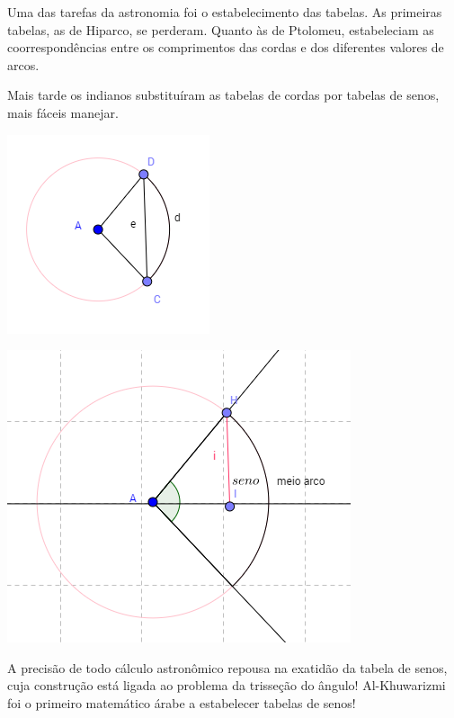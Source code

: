 Uma das tarefas da astronomia foi o estabelecimento das tabelas. As primeiras tabelas, as de Hiparco, se perderam. Quanto às de Ptolomeu, estabeleciam as coorrespondências entre os comprimentos das cordas e dos diferentes valores de arcos.

Mais tarde os indianos substituíram as tabelas de cordas por tabelas de senos, mais fáceis manejar.


\begin{center}
\includegraphics[scale=0.9]{./imagens/06.png}
\end{center}

\begin{center}
\includegraphics[scale=0.9]{./imagens/07.png}
\end{center}

A precisão de todo cálculo astronômico repousa na exatidão da tabela de senos, cuja construção está ligada ao problema da trisseção do ângulo! Al-Khuwarizmi foi o primeiro matemático árabe a estabelecer tabelas de senos! \cite{guedj2008teorema}

